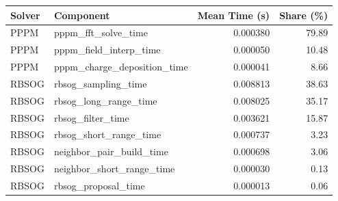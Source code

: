 \begin{tabular}{llrr}
\toprule
Solver & Component & Mean Time (s) & Share (\%) \\
\midrule
PPPM & pppm\_fft\_solve\_time & 0.000380 & 79.89 \\
PPPM & pppm\_field\_interp\_time & 0.000050 & 10.48 \\
PPPM & pppm\_charge\_deposition\_time & 0.000041 & 8.66 \\
RBSOG & rbsog\_sampling\_time & 0.008813 & 38.63 \\
RBSOG & rbsog\_long\_range\_time & 0.008025 & 35.17 \\
RBSOG & rbsog\_filter\_time & 0.003621 & 15.87 \\
RBSOG & rbsog\_short\_range\_time & 0.000737 & 3.23 \\
RBSOG & neighbor\_pair\_build\_time & 0.000698 & 3.06 \\
RBSOG & neighbor\_short\_range\_time & 0.000030 & 0.13 \\
RBSOG & rbsog\_proposal\_time & 0.000013 & 0.06 \\
\bottomrule
\end{tabular}
